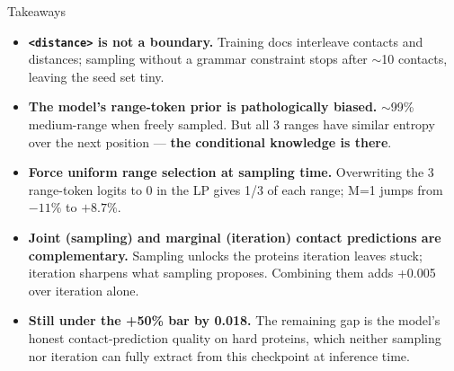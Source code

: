 \documentclass[aspectratio=169,11pt]{beamer}
\newcommand{\codeS}[1]{\texttt{\scriptsize\color{navy}#1}}
\begin{document}
\begin{frame}{Takeaways}
  \small
  \begin{itemize}
    \setlength\itemsep{0.3em}
    \item[\color{navy}\textbullet] \textbf{\codeS{<distance>} is not a boundary.}
      Training docs interleave contacts and distances; sampling without a
      grammar constraint stops after $\sim$10 contacts, leaving the seed set
      tiny.
    \item[\color{navy}\textbullet] \textbf{The model's range-token prior is
      pathologically biased.}
      $\sim$99\% medium-range when freely sampled. But all 3 ranges
      have similar entropy over the next position — \textbf{the
      conditional knowledge is there}.
    \item[\color{navy}\textbullet] \textbf{Force uniform range selection at
      sampling time.} Overwriting the 3 range-token logits to 0 in the LP
      gives 1/3 of each range; M=1 jumps from $-11\%$ to $+8.7\%$.
    \item[\color{navy}\textbullet] \textbf{Joint (sampling) and marginal
      (iteration) contact predictions are complementary.}
      Sampling unlocks the proteins iteration leaves stuck; iteration
      sharpens what sampling proposes. Combining them adds +0.005 over
      iteration alone.
    \item[\color{navy}\textbullet] \textbf{Still under the +50\% bar by 0.018.}
      The remaining gap is the model's honest contact-prediction quality on
      hard proteins, which neither sampling nor iteration can fully extract
      from this checkpoint at inference time.
  \end{itemize}
\end{frame}
\end{document}
